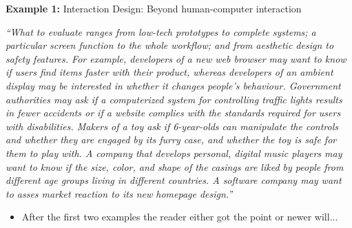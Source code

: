 \begin{frame}
  \textbf{Example 1:} Interaction Design: Beyond human-computer interaction
  
  \medskip
  
  {\tiny \it ``What to evaluate ranges from low-tech prototypes to complete
systems; a particular screen function to the whole workflow; and from aesthetic
design to safety features. For example, developers of a new web browser may want
to know if users find items faster with their product, whereas developers of an
ambient display may be interested in whether it changes people's behaviour.
Government authorities may ask if a computerized system for controlling traffic
lights results in fewer accidents or if a website complies with the standards
required for users with disabilities. Makers of a toy ask if 6-year-olds can
manipulate the controls and whether they are engaged by its furry case, and
whether the toy is safe for them to play with. A company that develops personal,
digital music players may want to know if the size, color, and shape of the
casings are liked by people from different age groups living in different
countries. A software company may want to asses market reaction to its new
homepage design.''}

  \medskip

  \begin{itemize}
  \item After the first two examples the reader either got the point or newer will...
  \end{itemize}
\end{frame}


